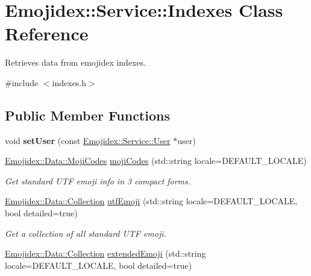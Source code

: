 \hypertarget{classEmojidex_1_1Service_1_1Indexes}{}\section{Emojidex\+:\+:Service\+:\+:Indexes Class Reference}
\label{classEmojidex_1_1Service_1_1Indexes}


Retrieves data from emojidex indexes.  




{\ttfamily \#include $<$indexes.\+h$>$}

\subsection*{Public Member Functions}
\begin{DoxyCompactItemize}
\item 
void {\bfseries set\+User} (const \hyperlink{classEmojidex_1_1Service_1_1User}{Emojidex\+::\+Service\+::\+User} $\ast$user)\hypertarget{classEmojidex_1_1Service_1_1Indexes_a94824b67e2e46b7bf46e1ec9f0040226}{}\label{classEmojidex_1_1Service_1_1Indexes_a94824b67e2e46b7bf46e1ec9f0040226}

\item 
\hyperlink{classEmojidex_1_1Data_1_1MojiCodes}{Emojidex\+::\+Data\+::\+Moji\+Codes} \hyperlink{classEmojidex_1_1Service_1_1Indexes_aad2b2a930b7665cc9a195cbaf302eb49}{moji\+Codes} (std\+::string locale=D\+E\+F\+A\+U\+L\+T\+\_\+\+L\+O\+C\+A\+LE)\hypertarget{classEmojidex_1_1Service_1_1Indexes_aad2b2a930b7665cc9a195cbaf302eb49}{}\label{classEmojidex_1_1Service_1_1Indexes_aad2b2a930b7665cc9a195cbaf302eb49}

\begin{DoxyCompactList}\small\item\em Get standard U\+TF emoji info in 3 compact forms. \end{DoxyCompactList}\item 
\hyperlink{classEmojidex_1_1Data_1_1Collection}{Emojidex\+::\+Data\+::\+Collection} \hyperlink{classEmojidex_1_1Service_1_1Indexes_a0c2b3e28fe19af86b556a9d5641ddeb4}{utf\+Emoji} (std\+::string locale=D\+E\+F\+A\+U\+L\+T\+\_\+\+L\+O\+C\+A\+LE, bool detailed=true)\hypertarget{classEmojidex_1_1Service_1_1Indexes_a0c2b3e28fe19af86b556a9d5641ddeb4}{}\label{classEmojidex_1_1Service_1_1Indexes_a0c2b3e28fe19af86b556a9d5641ddeb4}

\begin{DoxyCompactList}\small\item\em Get a collection of all standard U\+TF emoji. \end{DoxyCompactList}\item 
\hyperlink{classEmojidex_1_1Data_1_1Collection}{Emojidex\+::\+Data\+::\+Collection} \hyperlink{classEmojidex_1_1Service_1_1Indexes_a9106f50086dec7ff8496589883d5bd37}{extended\+Emoji} (std\+::string locale=D\+E\+F\+A\+U\+L\+T\+\_\+\+L\+O\+C\+A\+LE, bool detailed=true)\hypertarget{classEmojidex_1_1Service_1_1Indexes_a9106f50086dec7ff8496589883d5bd37}{}\label{classEmojidex_1_1Service_1_1Indexes_a9106f50086dec7ff8496589883d5bd37}


\end{DoxyCompactItemize}
